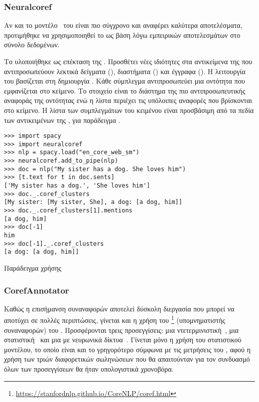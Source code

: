 \subsubsection{Neuralcoref}\label{subsec:4-neuralcoref}
Αν και το μοντέλο~\cite{lee2017end} του  είναι πιο σύγχρονο και αναφέρει καλύτερα αποτελέσματα,
προτιμήθηκε να χρησιμοποιηθεί το  ως βάση λόγω εμπειρικών αποτελεσμάτων στο σύνολο δεδομένων.

Το  υλοποιήθηκε ως επέκταση της .
Προσθέτει νέες ιδιότητες στα αντικείμενα της  που αντιπροσωπεύουν λεκτικά δείγματα (), διαστήματα () και έγγραφα ().
Η λειτουργία του βασίζεται στη δημιουργία .
Κάθε σύμπλεγμα αντιπροσωπεύει μια οντότητα που εμφανίζεται στο κείμενο.
Το στοιχείο  είναι το διάστημα της πιο αντιπροσωπευτικής αναφοράς της οντότητας
ενώ η λίστα  περιέχει τις υπόλοιπες αναφορές που βρίσκονται στο κείμενο.
Η λίστα των συμπλεγμάτων του κειμένου είναι προσβάσιμη από τα πεδία των αντικειμένων της , για παράδειγμα .

\begin{listing}
    \begin{verbatim}
>>> import spacy
>>> import neuralcoref
>>> nlp = spacy.load("en_core_web_sm")
>>> neuralcoref.add_to_pipe(nlp)
>>> doc = nlp("My sister has a dog. She loves him")
>>> [t.text for t in doc.sents]
['My sister has a dog.', 'She loves him']
>>> doc._.coref_clusters
[My sister: [My sister, She], a dog: [a dog, him]]
>>> doc._.coref_clusters[1].mentions
[a dog, him]
>>> doc[-1]
him
>>> doc[-1]._.coref_clusters
[a dog: [a dog, him]]
\end{verbatim}
    \caption{Παράδειγμα χρήσης }
\end{listing}

\subsubsection{CorefAnnotator}\label{subsec:4-CorefAnnotator}
Καθώς η επισήμανση συναναφορών αποτελεί δύσκολη διεργασία που μπορεί να αποτύχει σε πολλές περιπτώσεις,
γίνεται και η χρήση του \footnote{\url{https://stanfordnlp.github.io/CoreNLP/coref.html}} (υπομνηματιστής συναναφορών) του .
Προσφέρονται τρεις προσεγγίσεις: μια ντετερμινιστική~\cite{CorefAnnotatorD1,CorefAnnotatorD2,CorefAnnotatorD3}, μια στατιστική~\cite{CorefAnnotatorS} και μια με νευρωνικά δίκτυα~\cite{CorefAnnotatorN1,CorefAnnotatorN2}.
Γίνεται μόνο η χρήση του στατιστικού μοντέλου, το οποίο είναι και το γρηγορότερο σύμφωνα με τις μετρήσεις του ,
αφού η χρήση των τριών διαφορετικών σωληνώσεων που θα απαιτούνταν για τον συνδυασμό όλων των προσεγγίσεων θα ήταν υπολογιστικά χρονοβόρα.

